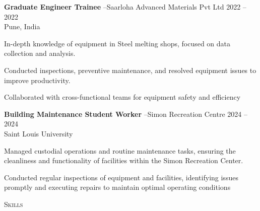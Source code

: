 \documentclass{article}
\newcommand{\employer}[4]{{
        \vspace*{2pt}%
        \textbf{#1} #2 \hfill #3\\ #4 \vspace*{2pt}}
        }
\newcommand{\lineunder}{
        \vspace*{-8pt} \\ \hspace*{-18pt} 
        \hrulefill \\
        }
\newcommand{\header}[1]{{
        \hspace*{-15pt}\vspace*{6pt} \textsc{#1}} \vspace*{-6pt} 
        \lineunder
        }
\renewcommand{\labelitemii}{
        $\vcenter{\hbox{\tiny$\bullet$}}$\hspace*{-3pt}
        }
\newenvironment{bullet-list-minor}{
          \begin{list}{\labelitemii}{\setlength\leftmargin{15pt} 
            \topsep 0pt \itemsep -2pt}}{\vspace*{4pt}\end{list}
            }
\begin{document}
      {
      \employer{Graduate Engineer Trainee}{--Saarloha Advanced Materials Pvt Ltd}{2022 -- 2022}{Pune, India}
      \begin{bullet-list-minor}
          \item In-depth knowledge of equipment in Steel melting shops, focused on data collection and analysis.
\item Conducted inspections, preventive maintenance, and resolved equipment issues to improve productivity.
\item Collaborated with cross-functional teams for equipment safety and efficiency
      \end{bullet-list-minor}
  


      \employer{Building Maintenance Student Worker}{--Simon Recreation Centre}{2024 -- 2024}{Saint Louis University}
      \begin{bullet-list-minor}
          \item Managed custodial operations and routine maintenance tasks, ensuring the cleanliness and functionality of facilities within the Simon Recreation Center.
\item Conducted regular inspections of equipment and facilities, identifying issues promptly and executing repairs to maintain optimal operating conditions
      \end{bullet-list-minor}
  }
      \vspace*{4pt}%
      \header{Skills}
\end{document}
